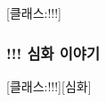 \documentclass{report}
\begin{document}
	\begin{story}{}{[클래스:!!!]}
		
	\end{story}
	
	\subsubsection{!!! 심화 이야기}
		\begin{story}{}{[클래스:!!!][심화]}
			
		\end{story}
\end{document}
